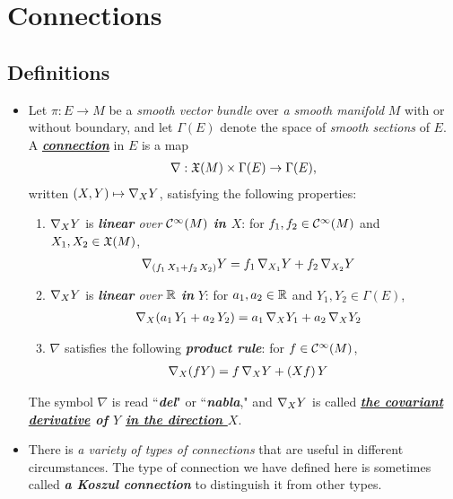 \documentclass[11pt]{article}
\begin{document}
\section{Connections}
\subsection{Definitions}
\begin{itemize}
\item \begin{definition}
Let $\pi: E \rightarrow M$ be a \emph{smooth vector bundle} over \emph{a smooth manifold} $M$ with or without boundary, and let $\Gamma(E)$ denote the space of \emph{smooth sections} of $E$. A \underline{\emph{\textbf{connection}}} in $E$ is a map 
\begin{align*}
\nabla: {\mathfrak X}(M) \times \Gamma(E) \rightarrow \Gamma(E),
\end{align*} written $(X, Y) \mapsto \nabla_{X}{Y}$, satisfying the following properties:
\begin{enumerate}
\item $\nabla_{X}{Y}$ is \emph{\textbf{linear} over ${\mathcal C}^{\infty}(M)$ \textbf{in $X$}}: for $f_1, f_2 \in {\mathcal C}^{\infty}(M)$ and $X_1, X_2  \in {\mathfrak X}(M)$,
\begin{align*}
\nabla_{\left(f_1\,X_1 + f_2\,X_2\right)}{Y} &= f_1\,\nabla_{X_1}{Y} + f_2\,\nabla_{X_2}{Y}
\end{align*}
\item $\nabla_{X}{Y}$ is \emph{\textbf{linear} over ${\mathbb R}$ \textbf{in}} $Y$: for $a_1, a_2 \in {\mathbb R}$ and $Y_1, Y_2  \in \Gamma(E)$,
\begin{align*}
\nabla_{X}{\left(a_1\,Y_1 + a_2\,Y_2\right)} &= a_1\,\nabla_{X}{Y_1} + a_2\,\nabla_{X}{Y_2}
\end{align*}
\item $\nabla$ satisfies the following \emph{\textbf{product rule}}: for $f \in {\mathcal C}^{\infty}(M)$,
\begin{align*}
\nabla_{X}{(fY)} &= f\,\nabla_{X}{Y} + (Xf)\,Y
\end{align*}
\end{enumerate} 
The symbol $\nabla$ is read ``\emph{\textbf{del}}" or ``\emph{\textbf{nabla}}," and $\nabla_{X}{Y}$ is called \emph{\textbf{\underline{the covariant derivative} of $Y$ \underline{in the direction $X$}}}.
\end{definition}

\item \begin{remark}
There is \emph{a variety of types of connections} that are useful in different circumstances. The type of connection we have defined here is sometimes called \emph{\textbf{a Koszul connection}} to distinguish it from other types. 
\end{remark}


\end{itemize}
\end{document}
